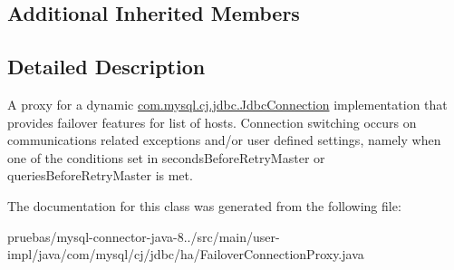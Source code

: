 \subsection*{Additional Inherited Members}


\subsection{Detailed Description}
A proxy for a dynamic \mbox{\hyperlink{interfacecom_1_1mysql_1_1cj_1_1jdbc_1_1_jdbc_connection}{com.\+mysql.\+cj.\+jdbc.\+Jdbc\+Connection}} implementation that provides failover features for list of hosts. Connection switching occurs on communications related exceptions and/or user defined settings, namely when one of the conditions set in \textquotesingle{}seconds\+Before\+Retry\+Master\textquotesingle{} or \textquotesingle{}queries\+Before\+Retry\+Master\textquotesingle{} is met. 

The documentation for this class was generated from the following file\+:\begin{DoxyCompactItemize}
\item 
pruebas/mysql-\/connector-\/java-\/8../src/main/user-\/impl/java/com/mysql/cj/jdbc/ha/Failover\+Connection\+Proxy.\+java\end{DoxyCompactItemize}
